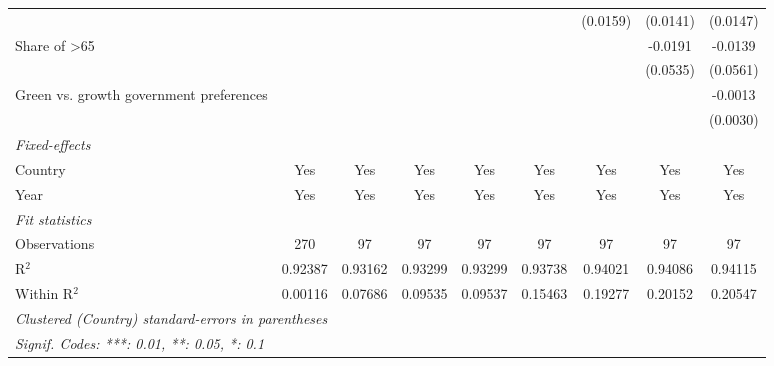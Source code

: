 \begin{table}[htbp]
\begin{tabular}{lcccccccc}
                                                   &          &          &          &          &              & (0.0159)     & (0.0141)     & (0.0147)\\   
      Share of >65                                 &          &          &          &          &              &              & -0.0191      & -0.0139\\   
                                                   &          &          &          &          &              &              & (0.0535)     & (0.0561)\\   
      Green vs. growth government preferences      &          &          &          &          &              &              &              & -0.0013\\   
                                                   &          &          &          &          &              &              &              & (0.0030)\\   
      \midrule
      \emph{Fixed-effects}\\
      Country                                      & Yes      & Yes      & Yes      & Yes      & Yes          & Yes          & Yes          & Yes\\  
      Year                                         & Yes      & Yes      & Yes      & Yes      & Yes          & Yes          & Yes          & Yes\\  
      \midrule
      \emph{Fit statistics}\\
      Observations                                 & 270      & 97       & 97       & 97       & 97           & 97           & 97           & 97\\  
      R$^2$                                        & 0.92387  & 0.93162  & 0.93299  & 0.93299  & 0.93738      & 0.94021      & 0.94086      & 0.94115\\  
      Within R$^2$                                 & 0.00116  & 0.07686  & 0.09535  & 0.09537  & 0.15463      & 0.19277      & 0.20152      & 0.20547\\  
      \midrule \midrule
      \multicolumn{9}{l}{\emph{Clustered (Country) standard-errors in parentheses}}\\
      \multicolumn{9}{l}{\emph{Signif. Codes: ***: 0.01, **: 0.05, *: 0.1}}\\
   \end{tabular}
\end{table}


